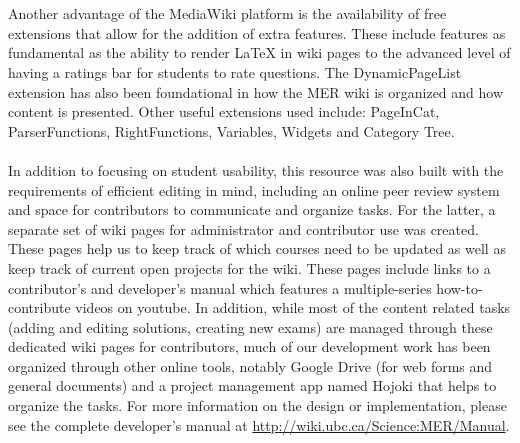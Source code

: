 \documentclass{primus}
\begin{document}
\\\\
\noindent{}Another advantage of the MediaWiki platform is the availability of free extensions that allow for the addition of extra features. These include features as fundamental as the ability to render LaTeX in wiki pages to the advanced level of having a ratings bar for students to rate questions. The DynamicPageList extension has also been foundational in how the MER wiki is organized and how content is presented. Other useful extensions used include: PageInCat, ParserFunctions, RightFunctions, Variables, Widgets and Category Tree.
\\\\
\noindent{}In addition to focusing on student usability, this resource was also built with the requirements of efficient editing in mind, including an online peer review system and space for contributors to communicate and organize tasks. For the latter, a separate set of wiki pages for administrator and contributor use was created. These pages help us to keep track of which courses need to be updated as well as keep track of current open projects for the wiki. These pages include links to a contributor’s and developer’s manual which features a multiple-series how-to-contribute videos on youtube. In addition, while most of the content related tasks (adding and editing solutions, creating new exams) are managed through these dedicated wiki pages for contributors, much of our development work has been organized through other online tools, notably Google Drive (for web forms and general documents) and a project management app named Hojoki that helps to organize the tasks. For more information on the design or implementation, please see the complete developer’s manual at \url{http://wiki.ubc.ca/Science:MER/Manual}.
\end{document}

